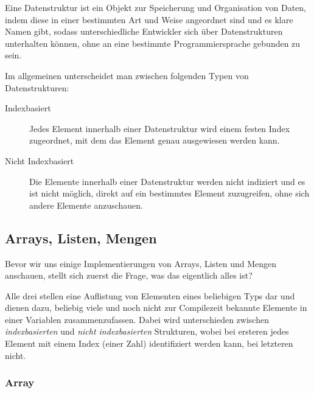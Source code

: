 
Eine Datenstruktur ist ein Objekt zur Speicherung und Organisation von Daten, indem diese in einer bestimmten Art und Weise angeordnet sind und es klare Namen gibt, sodass unterschiedliche Entwickler sich über  Datenstrukturen unterhalten können, ohne an eine bestimmte Programmiersprache gebunden zu sein.


Im allgemeinen unterscheidet man zwischen folgenden Typen von Datenstrukturen:
\begin{description}
	\item[Indexbasiert] Jedes Element innerhalb einer Datenstruktur wird einem festen Index zugeordnet, mit dem das Element genau ausgewiesen werden kann.
	\item[Nicht Indexbasiert] Die Elemente innerhalb einer Datenstruktur werden nicht indiziert und es ist nicht möglich, direkt auf ein bestimmtes Element zuzugreifen, ohne sich andere Elemente anzuschauen.
\end{description}

\subsection{Arrays, Listen, Mengen} \functionalMark \imperativeMark \oopMark
	Bevor wir uns einige Implementierungen von Arrays, Listen und Mengen anschauen, stellt sich zuerst die Frage, was das eigentlich alles ist?
	
	Alle drei stellen eine Auflistung von Elementen eines beliebigen Typs dar und dienen dazu, beliebig viele und noch nicht zur Compilezeit bekannte Elemente in einer Variablen zusammenzufassen. Dabei wird unterschieden zwischen \textit{indexbasierten} und \textit{nicht indexbasierten} Strukturen, wobei bei ersteren jedes Element mit einem Index (einer Zahl) identifiziert werden kann, bei letzteren nicht.
	
	\subsubsection{Array}
	
